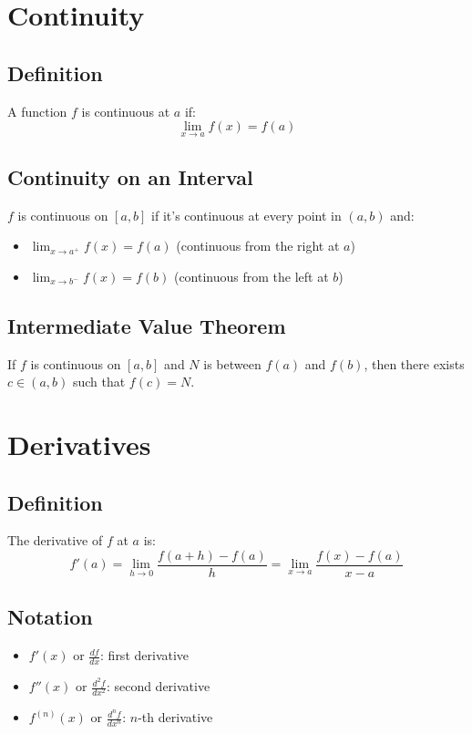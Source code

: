 \documentclass[11pt]{article}
\begin{document}
\section{Continuity}

\subsection{Definition}
A function $f$ is continuous at $a$ if:
$$\lim_{x \to a} f(x) = f(a)$$

\subsection{Continuity on an Interval}
$f$ is continuous on $[a,b]$ if it's continuous at every point in $(a,b)$ and:
\begin{itemize}
    \item $\lim_{x \to a^+} f(x) = f(a)$ (continuous from the right at $a$)
    \item $\lim_{x \to b^-} f(x) = f(b)$ (continuous from the left at $b$)
\end{itemize}

\subsection{Intermediate Value Theorem}
If $f$ is continuous on $[a,b]$ and $N$ is between $f(a)$ and $f(b)$, then there exists $c \in (a,b)$ such that $f(c) = N$.

\section{Derivatives}

\subsection{Definition}
The derivative of $f$ at $a$ is:
$$f'(a) = \lim_{h \to 0} \frac{f(a+h) - f(a)}{h} = \lim_{x \to a} \frac{f(x) - f(a)}{x - a}$$

\subsection{Notation}
\begin{itemize}
    \item $f'(x)$ or $\frac{df}{dx}$: first derivative
    \item $f''(x)$ or $\frac{d^2f}{dx^2}$: second derivative
    \item $f^{(n)}(x)$ or $\frac{d^nf}{dx^n}$: $n$-th derivative
\end{itemize}
\end{document}
